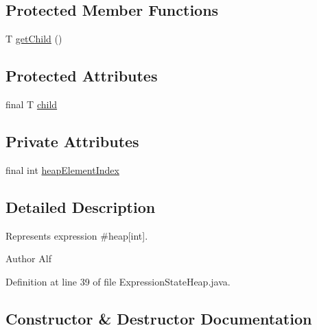 \subsection*{Protected Member Functions}
\begin{DoxyCompactItemize}
\item 
T \hyperlink{classgov_1_1nasa_1_1jpf_1_1inspector_1_1server_1_1expression_1_1_expression_state_unary_operator_a150bac338d6557f79ca185d3f6ad6e06}{get\+Child} ()
\end{DoxyCompactItemize}
\subsection*{Protected Attributes}
\begin{DoxyCompactItemize}
\item 
final T \hyperlink{classgov_1_1nasa_1_1jpf_1_1inspector_1_1server_1_1expression_1_1_expression_state_unary_operator_a66041b1f569a361549e28a00f7ca5f2f}{child}
\end{DoxyCompactItemize}
\subsection*{Private Attributes}
\begin{DoxyCompactItemize}
\item 
final int \hyperlink{classgov_1_1nasa_1_1jpf_1_1inspector_1_1server_1_1expression_1_1expressions_1_1_expression_state_heap_afffce10742fdcd015d276f6c397a9921}{heap\+Element\+Index}
\end{DoxyCompactItemize}


\subsection{Detailed Description}
Represents expression \#heap\mbox{[}int\mbox{]}. 

\begin{DoxyAuthor}{Author}
Alf 
\end{DoxyAuthor}


Definition at line 39 of file Expression\+State\+Heap.\+java.



\subsection{Constructor \& Destructor Documentation}
